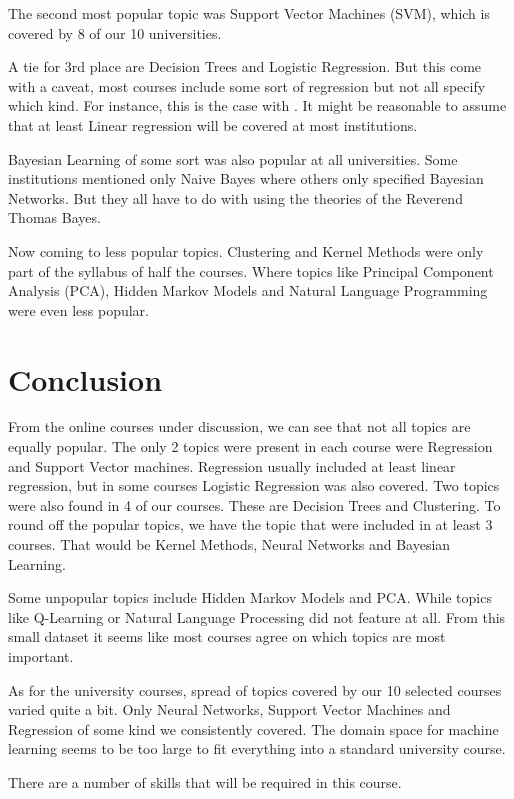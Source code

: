 \documentclass[10pt,a4paper]{article}
\begin{document}
The second most popular topic was Support Vector Machines (SVM), which is covered by 8 of our 10 universities.

A tie for 3rd place are Decision Trees and Logistic Regression. But this come with a caveat, most courses include some sort of regression but not all specify which kind. For instance, this is the case with \cite{mel}. It might be reasonable to assume that at least Linear regression will be covered at most institutions.

Bayesian Learning of some sort was also popular at all universities. Some institutions mentioned only Naive Bayes where others only specified Bayesian Networks. But they all have to do with using the theories of the Reverend Thomas Bayes.

Now coming to less popular topics. Clustering and Kernel Methods were only part of the syllabus of half the courses. Where topics like Principal Component Analysis (PCA), Hidden Markov Models and Natural Language Programming were even less popular.

\section{Conclusion}

From the online courses under discussion, we can see that not all topics are equally popular. The only 2 topics were present in each course were Regression and Support Vector machines. Regression usually included at least linear regression, but in some courses Logistic Regression was also covered. Two topics were also found in 4 of our courses. These are Decision Trees and Clustering. To round off the popular topics, we have the topic that were included in at least 3 courses. That would be Kernel Methods, Neural Networks and Bayesian Learning. 

Some unpopular topics include Hidden Markov Models and PCA. While topics like Q-Learning or Natural Language Processing did not feature at all.
From this small dataset it seems like most courses agree on which topics are most important.

As for the university courses, spread of topics covered by our 10 selected courses varied quite a bit. Only Neural Networks, Support Vector Machines and Regression of some kind we consistently covered.
The domain space for machine learning seems to be too large to fit everything into a standard university course.

There are a number of skills that will be required in this course.
\end{document}
